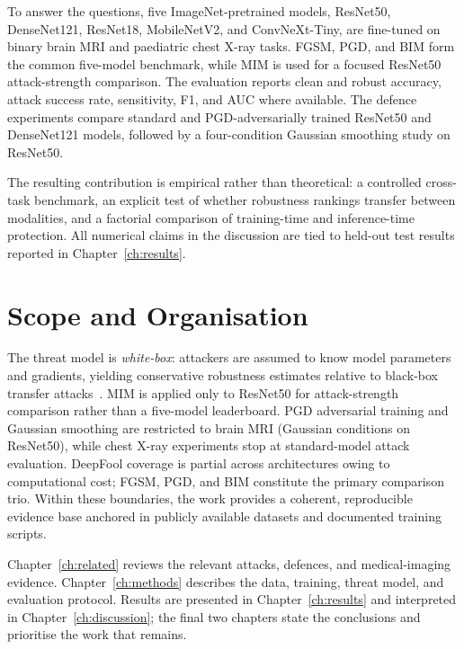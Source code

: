 \documentclass[12pt,a4paper,oneside]{report}
\begin{document}
To answer the questions, five ImageNet-pretrained models, ResNet50, DenseNet121, ResNet18, MobileNetV2, and ConvNeXt-Tiny, are fine-tuned on binary brain MRI and paediatric chest X-ray tasks. FGSM, PGD, and BIM form the common five-model benchmark, while MIM is used for a focused ResNet50 attack-strength comparison. The evaluation reports clean and robust accuracy, attack success rate, sensitivity, F1, and AUC where available. The defence experiments compare standard and PGD-adversarially trained ResNet50 and DenseNet121 models, followed by a four-condition Gaussian smoothing study on ResNet50.

The resulting contribution is empirical rather than theoretical: a controlled cross-task benchmark, an explicit test of whether robustness rankings transfer between modalities, and a factorial comparison of training-time and inference-time protection. All numerical claims in the discussion are tied to held-out test results reported in Chapter~\ref{ch:results}.

\section{Scope and Organisation}
\label{sec:scope}


The threat model is \emph{white-box}: attackers are assumed to know model parameters and gradients, yielding conservative robustness estimates relative to black-box transfer attacks~\cite{papernot2017practical}. MIM is applied only to ResNet50 for attack-strength comparison rather than a five-model leaderboard. PGD adversarial training and Gaussian smoothing are restricted to brain MRI (Gaussian conditions on ResNet50), while chest X-ray experiments stop at standard-model attack evaluation. DeepFool coverage is partial across architectures owing to computational cost; FGSM, PGD, and BIM constitute the primary comparison trio. Within these boundaries, the work provides a coherent, reproducible evidence base anchored in publicly available datasets and documented training scripts.

Chapter~\ref{ch:related} reviews the relevant attacks, defences, and medical-imaging evidence. Chapter~\ref{ch:methods} describes the data, training, threat model, and evaluation protocol. Results are presented in Chapter~\ref{ch:results} and interpreted in Chapter~\ref{ch:discussion}; the final two chapters state the conclusions and prioritise the work that remains.
\end{document}
